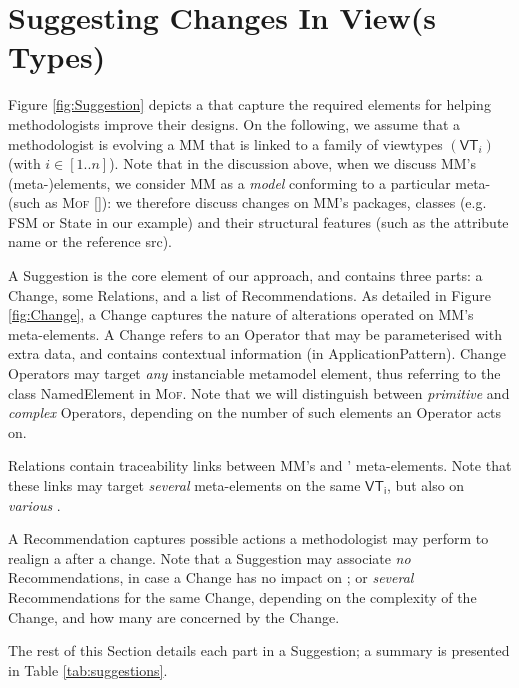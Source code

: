 \section{Suggesting Changes In View(s Types)}
\label{sec:Suggestion}

Figure \ref{fig:Suggestion} depicts a \metamodel that capture the
required elements for helping methodologists improve their designs.
On the following, we assume that a methodologist is evolving a \metamodel
\textsf{MM} that is linked to a family of viewtypes $(\mathsf{VT}_i)$ 
(with $i\in [1..n]$). Note that in the discussion above, when we discuss
\textsf{MM}'s (meta-)elements, we consider \textsf{MM} as a \emph{model}
conforming to a particular meta-\metamodel (such as \textsc{Mof} \ref{}):
we therefore discuss changes on \textsf{MM}'s packages, classes (e.g. 
\textsf{FSM} or \textsf{State} in our example) and their structural features
(such as the attribute \textsf{name} or the reference \textsf{src}).

A \textsf{Suggestion} is the core element of our approach, and contains three 
parts: a \textsf{Change}, some \textsf{Relation}s, and a list of 
\textsf{Recommendation}s. 
%
As detailed in Figure \ref{fig:Change}, a \textsf{Change} captures the nature of
alterations operated on \textsf{MM}'s meta-elements. A \textsf{Change} refers 
to an \textsf{Operator} that may be parameterised with extra data, and contains 
contextual information (in \textsf{ApplicationPattern}). 
Change \textsf{Operator}s may target \emph{any} instanciable metamodel element, 
thus referring to the class \textsf{NamedElement} in \textsc{Mof}. Note that we 
will distinguish between \emph{primitive} and \emph{complex} \textsf{Operator}s,
depending on the number of such \metamodel elements an \textsf{Operator} acts on.

\textsf{Relation}s contain traceability links between \textsf{MM}'s and \viewtypes'
meta-elements. Note that these links may target \emph{several} meta-elements on 
the same \viewtype $\mathsf{VT_i}$, but also on \emph{various} \viewtypes. 

A \textsf{Recommendation} captures possible actions a methodologist may perform
to realign a \viewtype after a change. Note that a \textsf{Suggestion} may 
associate \emph{no} \textsf{Recommendation}s, in case a \textsf{Change} has no
impact on \viewtypes; or \emph{several} \textsf{Recommendation}s for the same 
\textsf{Change}, depending on the complexity of the \textsf{Change}, and how 
many \viewtypes are concerned by the \textsf{Change}.

The rest of this Section details each part in a \textsf{Suggestion}; a summary
is presented in Table \ref{tab:suggestions}.





